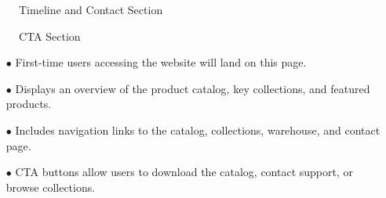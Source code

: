 \documentclass[oneside,a4paper,12pt,explicit]{book}
\begin{document}
\begin{figure}[H]
    \centering
    \begin{minipage}{0.48\textwidth}
        \centering
        \caption{Timeline and Contact Section}
    \end{minipage}
    \hfill
    \begin{minipage}{0.44\textwidth}
        \centering
        \caption{CTA Section}
    \end{minipage}
\end{figure}

\begin{enumerate}
    \item[$\bullet$] First-time users accessing the website will land on this page.
    \item[$\bullet$] Displays an overview of the product catalog, key collections, and featured products.
    \item[$\bullet$] Includes navigation links to the catalog, collections, warehouse, and contact page.
    \item[$\bullet$] CTA buttons allow users to download the catalog, contact support, or browse collections.
\end{enumerate}
\end{document}
